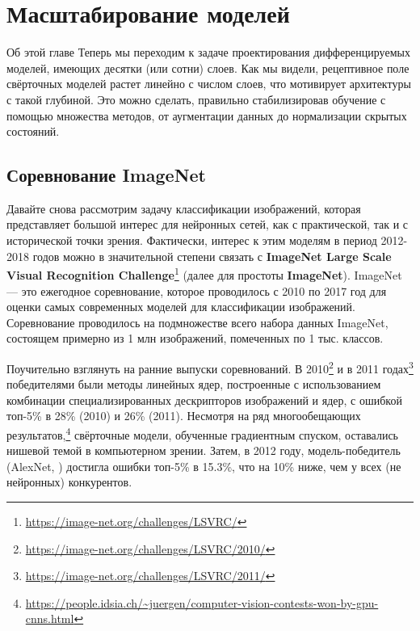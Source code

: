 \chapter{Масштабирование моделей}
\label{chap:deep_cnns}

\begin{supportbox}{Об этой главе}
Теперь мы переходим к задаче проектирования дифференцируемых моделей, имеющих десятки (или сотни) слоев. Как мы видели, рецептивное поле свёрточных моделей растет линейно с числом слоев, что мотивирует архитектуры с такой глубиной. Это можно сделать, правильно стабилизировав обучение с помощью множества методов, от аугментации данных до нормализации скрытых состояний.
\end{supportbox}


\section{Соревнование ImageNet}

Давайте снова рассмотрим задачу классификации изображений, которая представляет большой интерес для нейронных сетей, как с практической, так и с исторической точки зрения. Фактически, интерес к этим моделям в период 2012-2018 годов можно в значительной степени связать с \textbf{ImageNet Large Scale Visual Recognition Challenge}\footnote{\url{https://image-net.org/challenges/LSVRC/}} (далее для простоты \textbf{ImageNet}). ImageNet — это ежегодное соревнование, которое проводилось с 2010 по 2017 год для оценки самых современных моделей для классификации изображений. Соревнование проводилось на подмножестве всего набора данных ImageNet, состоящем примерно из 1 млн изображений, помеченных по 1 тыс. классов. 

Поучительно взглянуть на ранние выпуски соревнований. В 2010\footnote{\url{https://image-net.org/challenges/LSVRC/2010/}} и в 2011 годах\footnote{\url{https://image-net.org/challenges/LSVRC/2011/}} победителями были методы линейных ядер, построенные с использованием комбинации специализированных дескрипторов изображений и ядер, с ошибкой топ-5\% в 28\% (2010) и 26\% (2011). Несмотря на ряд многообещающих результатов,\footnote{\url{https://people.idsia.ch/~juergen/computer-vision-contests-won-by-gpu-cnns.html}} свёрточные модели, обученные градиентным спуском, оставались нишевой темой в компьютерном зрении. Затем, в 2012 году, модель-победитель (AlexNet, \cite{krizhevsky2012imagenet}) достигла ошибки топ-5\% в 15.3\%, что на 10\% ниже, чем у всех (не нейронных) конкурентов. 

